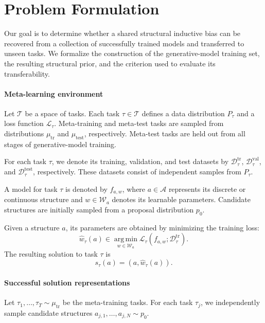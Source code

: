 \section{Problem Formulation}

Our goal is to determine whether a shared structural inductive bias can be
recovered from a collection of successfully trained models and transferred
to unseen tasks. We formalize the construction of the generative-model
training set, the resulting structural prior, and the criterion used to
evaluate its transferability.

\paragraph*{Meta-learning environment}

Let $\mathcal{T}$ be a space of tasks. Each task $\tau\in\mathcal{T}$ defines
a data distribution $P_\tau$ and a loss function $\mathcal{L}_\tau$.
Meta-training and meta-test tasks are sampled from distributions
$\mu_{\mathrm{tr}}$ and $\mu_{\mathrm{test}}$, respectively. Meta-test tasks
are held out from all stages of generative-model training.

For each task $\tau$, we denote its training, validation, and test datasets
by $\mathcal{D}^{\mathrm{tr}}_\tau$,
$\mathcal{D}^{\mathrm{val}}_\tau$, and
$\mathcal{D}^{\mathrm{test}}_\tau$, respectively. These datasets consist of
independent samples from $P_\tau$.

A model for task $\tau$ is denoted by $f_{a,w}$, where
$a\in\mathcal{A}$ represents its discrete or continuous structure and
$w\in\mathcal{W}_a$ denotes its learnable parameters. Candidate structures
are initially sampled from a proposal distribution $p_0$.

Given a structure $a$, its parameters are obtained by minimizing the
training loss:
$$
\widehat{w}_\tau(a)
\in
\operatorname*{arg\,min}_{w\in\mathcal{W}_a}
\mathcal{L}_\tau
\left(
f_{a,w};
\mathcal{D}^{\mathrm{tr}}_\tau
\right).
$$
The resulting solution to task $\tau$ is
$$
s_\tau(a)
=
\left(
a,\widehat{w}_\tau(a)
\right).
$$

\paragraph*{Successful solution representations}

Let
$\tau_1,\ldots,\tau_T\sim\mu_{\mathrm{tr}}$
be the meta-training tasks. For each task $\tau_j$, we independently sample
candidate structures
$a_{j,1},\ldots,a_{j,N}\sim p_0$.

